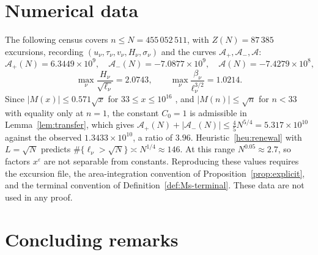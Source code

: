 \documentclass[11pt]{amsart}
\numberwithin{equation}{section}
\theoremstyle{plain}
\theoremstyle{definition}
\theoremstyle{remark}
\newcommand{\Ap}{\mathcal{A}_{+}}
\newcommand{\Am}{\mathcal{A}_{-}}
\newcommand{\Anet}{\mathcal{A}}
\newcommand{\eps}{\varepsilon}
\begin{document}
\section{Numerical data}
\label{sec:data}

The following census covers $n\le N=455\,052\,511$, with $Z(N)=87\,385$
excursions, recording $(u_\nu,\tau_\nu,v_\nu,H_\nu,\sigma_\nu)$ and the
curves $\Ap,\Am,\Anet$:
\begin{equation}
\label{eq:census_values}
  \Ap(N)=6.3449\times10^9,\quad \Am(N)=-7.0877\times10^9,\quad
  \Anet(N)=-7.4279\times10^8,
\end{equation}
\begin{equation}
\label{eq:census_max}
  \max_\nu\frac{H_\nu}{\sqrt{\ell_\nu}}=2.0743,\qquad
  \max_\nu\frac{\beta_\nu}{\ell_\nu^{3/2}}=1.0214 .
\end{equation}
Since $|M(x)|\le0.571\sqrt x$ for $33\le x\le10^{16}$ \cite{Hurst18}, and
$|M(n)|\le\sqrt n$ for $n<33$ with equality only at $n=1$, the
constant $C_0=1$ is admissible in Lemma~\ref{lem:transfer}, which gives
$\Ap(N)+|\Am(N)|\le\frac45N^{5/4}=5.317\times10^{10}$ against the observed
$1.3433\times10^{10}$, a ratio of $3.96$. Heuristic~\ref{heu:renewal} with
$L=\sqrt N$ predicts $\#\{\ell_\nu>\sqrt N\}\asymp N^{1/4}\approx146$. At
this range $N^{0.05}\approx2.7$, so factors $x^\eps$ are not separable from
constants. Reproducing these values requires the excursion file, the
area-integration convention of Proposition~\ref{prop:explicit}, and the
terminal convention of Definition~\ref{def:Ms-terminal}. These data are not used in any proof.

\section{Concluding remarks}
\label{sec:conclusions}
\end{document}
